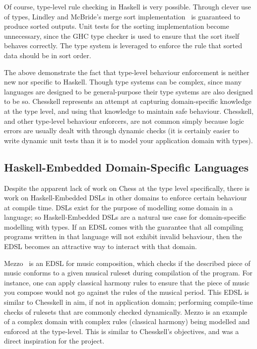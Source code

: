 Of course, type-level rule checking in Haskell is very possible. Through clever use of types, Lindley and McBride's merge sort implementation~\cite{hasochism} is guaranteed to produce sorted outputs. Unit tests for the sorting implementation become unnecessary, since the GHC type checker is used to ensure that the sort itself behaves correctly. The type system is leveraged to enforce the rule that sorted data should be in sort order.

The above demonstrate the fact that type-level behaviour enforcement is neither new nor specific to Haskell. Though type systems can be complex, since many languages are designed to be general-purpose their type systems are also designed to be so. Chesskell represents an attempt at capturing domain-specific knowledge at the type level, and using that knowledge to maintain safe behaviour. Chesskell, and other type-level behaviour enforcers, are not common simply because logic errors are usually dealt with through dynamic checks (it is certainly easier to write dynamic unit tests than it is to model your application domain with types).

\subsection{Haskell-Embedded Domain-Specific Languages}

Despite the apparent lack of work on Chess at the type level specifically, there is work on Haskell-Embedded DSLs in other domains to enforce certain behaviour at compile time. DSLs exist for the purpose of modelling some domain in a language; so Haskell-Embedded DSLs are a natural use case for domain-specific modelling with types. If an EDSL comes with the guarantee that all compiling programs written in that language will not exhibit invalid behaviour, then the EDSL becomes an attractive way to interact with that domain.

Mezzo~\cite{mezzohaskellsymposium} is an EDSL for music composition, which checks if the described piece of music conforms to a given musical ruleset during compilation of the program. For instance, one can apply classical harmony rules to ensure that the piece of music you compose would not go against the rules of the musical period. This EDSL is similar to Chesskell in aim, if not in application domain; performing compile-time checks of rulesets that are commonly checked dynamically. Mezzo is an example of a complex domain with complex rules (classical harmony) being modelled and enforced at the type-level. This is similar to Chesskell's objectives, and was a direct inspiration for the project.

